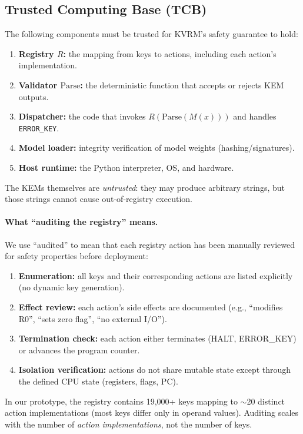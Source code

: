 \documentclass[11pt]{article}
\begin{document}
\subsection{Trusted Computing Base (TCB)}
The following components must be trusted for KVRM's safety guarantee to hold:
\begin{enumerate}[leftmargin=*]
  \item \textbf{Registry $R$:} the mapping from keys to actions, including each action's implementation.
  \item \textbf{Validator $\mathrm{Parse}$:} the deterministic function that accepts or rejects KEM outputs.
  \item \textbf{Dispatcher:} the code that invokes $R(\mathrm{Parse}(M(x)))$ and handles \texttt{ERROR\_KEY}.
  \item \textbf{Model loader:} integrity verification of model weights (hashing/signatures).
  \item \textbf{Host runtime:} the Python interpreter, OS, and hardware.
\end{enumerate}
The KEMs themselves are \emph{untrusted}: they may produce arbitrary strings, but those strings cannot cause out-of-registry execution.

\paragraph{What ``auditing the registry'' means.}
We use ``audited'' to mean that each registry action has been manually reviewed for safety properties before deployment:
\begin{enumerate}[leftmargin=*]
  \item \textbf{Enumeration:} all keys and their corresponding actions are listed explicitly (no dynamic key generation).
  \item \textbf{Effect review:} each action's side effects are documented (e.g., ``modifies R0'', ``sets zero flag'', ``no external I/O'').
  \item \textbf{Termination check:} each action either terminates (HALT, ERROR\_KEY) or advances the program counter.
  \item \textbf{Isolation verification:} actions do not share mutable state except through the defined CPU state (registers, flags, PC).
\end{enumerate}
In our prototype, the registry contains 19{,}000+ keys mapping to $\sim$20 distinct action implementations (most keys differ only in operand values). Auditing scales with the number of \emph{action implementations}, not the number of keys.
\end{document}
